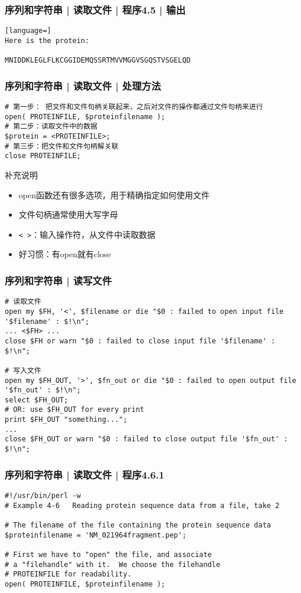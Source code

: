 \begin{frame}[fragile]
  \frametitle{序列和字符串 | 读取文件 | 程序4.5 | 输出}
  \vspace{-1.5em}
\begin{lstlisting}[language=]
Here is the protein:

MNIDDKLEGLFLKCGGIDEMQSSRTMVVMGGVSGQSTVSGELQD
\end{lstlisting}
\end{frame}

\begin{frame}[fragile]
  \frametitle{序列和字符串 | 读取文件 | \alert{处理方法}}
  \vspace{-1.5em}
\begin{lstlisting}
# 第一步： 把文件和文件句柄关联起来，之后对文件的操作都通过文件句柄来进行
open( PROTEINFILE, $proteinfilename );
# 第二步：读取文件中的数据
$protein = <PROTEINFILE>;
# 第三步：把文件和文件句柄解关联
close PROTEINFILE;
\end{lstlisting}
\pause
\begin{block}{补充说明}
  \begin{itemize}
    \item open函数还有很多选项，用于精确指定如何使用文件
    \item 文件句柄通常使用大写字母
    \item \verb|< >|：输入操作符，从文件中读取数据
    \item 好习惯：有open就有close
  \end{itemize}
\end{block}
\end{frame}

\begin{frame}[fragile]
  \frametitle{序列和字符串 | \alert{读写文件}}
  \vspace{-1.5em}
\begin{lstlisting}[basicstyle=\small\tt]
# 读取文件
open my $FH, '<', $filename or die "$0 : failed to open input file '$filename' : $!\n";
... <$FH> ...
close $FH or warn "$0 : failed to close input file '$filename' : $!\n";

# 写入文件
open my $FH_OUT, '>', $fn_out or die "$0 : failed to open output file '$fn_out' : $!\n";
select $FH_OUT;
# OR: use $FH_OUT for every print
print $FH_OUT "something...";
... 
close $FH_OUT or warn "$0 : failed to close output file '$fn_out' : $!\n";
\end{lstlisting}
\end{frame}

\begin{frame}[fragile]
  \frametitle{序列和字符串 | 读取文件 | 程序4.6.1}
  \vspace{-1.5em}
\begin{lstlisting}
#!/usr/bin/perl -w
# Example 4-6   Reading protein sequence data from a file, take 2

# The filename of the file containing the protein sequence data
$proteinfilename = 'NM_021964fragment.pep';

# First we have to "open" the file, and associate
# a "filehandle" with it.  We choose the filehandle
# PROTEINFILE for readability.
open( PROTEINFILE, $proteinfilename );
\end{lstlisting}
\end{frame}

